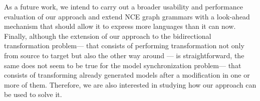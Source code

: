 \documentclass[runningheads]{llncs}
\begin{document}
As a future work, we intend to carry out a broader usability and performance evaluation of our approach and extend NCE graph grammars with a look-ahead mechanism that should allow it to express more languages than it can now. Finally, although the extension of our approach to the bidirectional transformation problem--- that consists of performing transformation not only from source to target but also the other way around --- is straightforward, the same does not seem to be true for the model synchronization problem--- that consists of transforming already generated models after a modification in one or more of them. Therefore, we are also interested in studying how our approach can be used to solve it.

%
%
%


\end{document}
